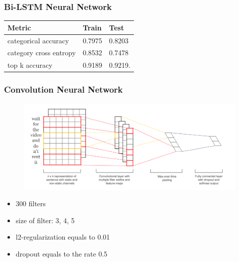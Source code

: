 \documentclass[14pt]{beamer}
\begin{document}
		
		\begin{frame}
			\frametitle{Bi-LSTM Neural Network}
			\begin{table}[h]
				\centering
				\begin{tabular}{| p{4cm} | p{3cm} | p{3cm} |}
					\hline
					\textbf{Metric}  & \textbf{Train} & \textbf{Test}                                                    
					\\ \hline
					categorical accuracy   &  0.7975 & 0.8203
					\\ \hline
					category cross entropy  &  0.8532 & 0.7478
					\\ \hline
					top k accuracy   &  0.9189 & 0.9219.
					\\ \hline		
				\end{tabular}
			\end{table}	
		\end{frame}
		
		
		\begin{frame}
			\frametitle{Convolution Neural Network }
			\begin{figure}[ht] 
				\center
				\includegraphics [scale=0.3] {CNN}
			\end{figure}
			\begin{itemize}
				\item 300 filters
				\item size of filter: 3, 4, 5
				\item l2-regularization equals to 0.01 
				\item dropout equals to the rate 0.5
			\end{itemize}	
		\end{frame}
		
\end{document}
